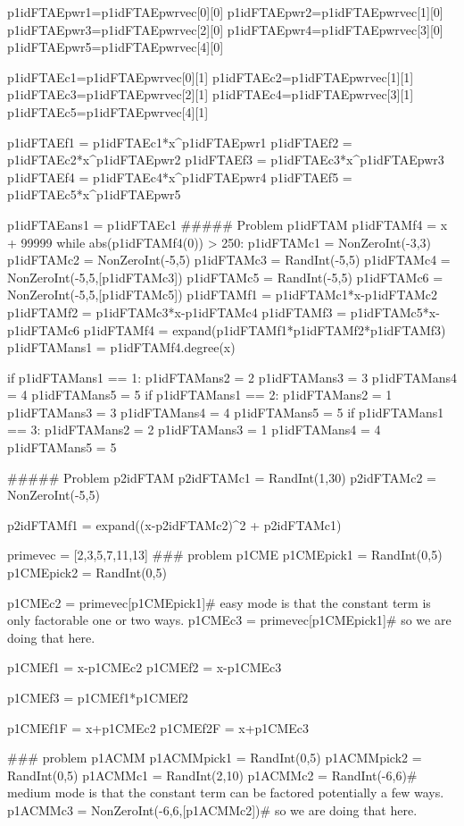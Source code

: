 \documentclass{ximera}
\begin{document}
\begin{sagesilent}
p1idFTAEpwr1=p1idFTAEpwrvec[0][0]
p1idFTAEpwr2=p1idFTAEpwrvec[1][0]
p1idFTAEpwr3=p1idFTAEpwrvec[2][0]
p1idFTAEpwr4=p1idFTAEpwrvec[3][0]
p1idFTAEpwr5=p1idFTAEpwrvec[4][0]

p1idFTAEc1=p1idFTAEpwrvec[0][1]
p1idFTAEc2=p1idFTAEpwrvec[1][1]
p1idFTAEc3=p1idFTAEpwrvec[2][1]
p1idFTAEc4=p1idFTAEpwrvec[3][1]
p1idFTAEc5=p1idFTAEpwrvec[4][1]




p1idFTAEf1 = p1idFTAEc1*x^p1idFTAEpwr1
p1idFTAEf2 = p1idFTAEc2*x^p1idFTAEpwr2
p1idFTAEf3 = p1idFTAEc3*x^p1idFTAEpwr3
p1idFTAEf4 = p1idFTAEc4*x^p1idFTAEpwr4
p1idFTAEf5 = p1idFTAEc5*x^p1idFTAEpwr5

p1idFTAEans1 =  p1idFTAEc1
##### Problem p1idFTAM
p1idFTAMf4 = x + 99999
while abs(p1idFTAMf4(0)) > 250:
    p1idFTAMc1 = NonZeroInt(-3,3)
    p1idFTAMc2 = NonZeroInt(-5,5)
    p1idFTAMc3 = RandInt(-5,5)
    p1idFTAMc4 = NonZeroInt(-5,5,[p1idFTAMc3])
    p1idFTAMc5 = RandInt(-5,5)
    p1idFTAMc6 = NonZeroInt(-5,5,[p1idFTAMc5])
    p1idFTAMf1 = p1idFTAMc1*x-p1idFTAMc2
    p1idFTAMf2 = p1idFTAMc3*x-p1idFTAMc4
    p1idFTAMf3 = p1idFTAMc5*x-p1idFTAMc6
    p1idFTAMf4 = expand(p1idFTAMf1*p1idFTAMf2*p1idFTAMf3)
    p1idFTAMans1 = p1idFTAMf4.degree(x)


if p1idFTAMans1 == 1:
    p1idFTAMans2 = 2
    p1idFTAMans3 = 3
    p1idFTAMans4 = 4
    p1idFTAMans5 = 5
if p1idFTAMans1 == 2:
    p1idFTAMans2 = 1
    p1idFTAMans3 = 3
    p1idFTAMans4 = 4
    p1idFTAMans5 = 5
if p1idFTAMans1 == 3:
    p1idFTAMans2 = 2
    p1idFTAMans3 = 1
    p1idFTAMans4 = 4
    p1idFTAMans5 = 5


##### Problem p2idFTAM
p2idFTAMc1 = RandInt(1,30)
p2idFTAMc2 = NonZeroInt(-5,5)

p2idFTAMf1 = expand((x-p2idFTAMc2)^2 + p2idFTAMc1)


primevec = [2,3,5,7,11,13]
### problem p1CME
p1CMEpick1 = RandInt(0,5)
p1CMEpick2 = RandInt(0,5)

p1CMEc2 = primevec[p1CMEpick1]# easy mode is that the constant term is only factorable one or two ways.
p1CMEc3 = primevec[p1CMEpick1]# so we are doing that here.

p1CMEf1 = x-p1CMEc2
p1CMEf2 = x-p1CMEc3

p1CMEf3 = p1CMEf1*p1CMEf2

p1CMEf1F = x+p1CMEc2
p1CMEf2F = x+p1CMEc3

### problem p1ACMM
p1ACMMpick1 = RandInt(0,5)
p1ACMMpick2 = RandInt(0,5)
p1ACMMc1 = RandInt(2,10)
p1ACMMc2 = RandInt(-6,6)# medium mode is that the constant term can be factored potentially a few ways.
p1ACMMc3 = NonZeroInt(-6,6,[p1ACMMc2])# so we are doing that here.


\end{sagesilent}
\end{document}
